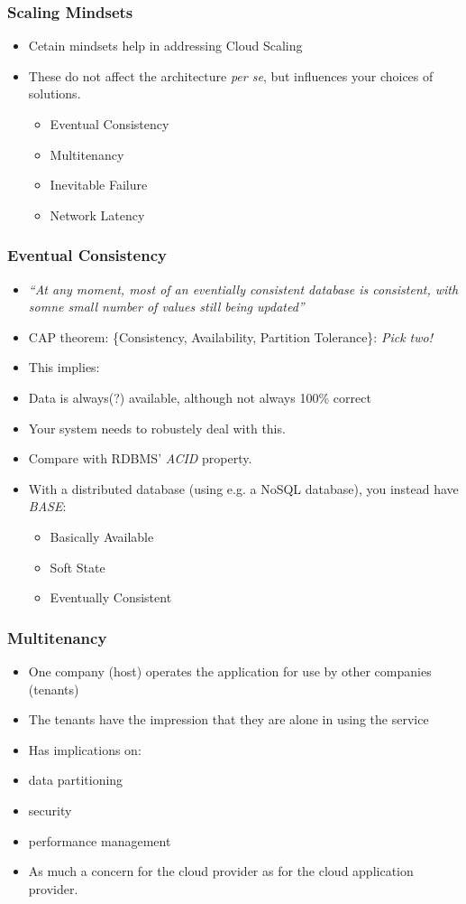\documentclass[10pt]{beamer}
\def\subitem{\item[\hspace{1.5cm} -]}
\begin{document}
\begin{frame}[t]
\frametitle{Scaling Mindsets}
\begin{itemize}
\item Cetain mindsets help in addressing Cloud Scaling 
\item These do not affect the architecture \emph{per se}, but influences your choices of solutions.
\begin{itemize}
\item Eventual Consistency
\item Multitenancy
\item Inevitable Failure
\item Network Latency
\end{itemize}
\end{itemize}
\end{frame}

\begin{frame}[t]
\frametitle{Eventual Consistency}
\begin{itemize}[<+->]
\item \emph{``At any moment, most of an eventially consistent database is consistent, with somne small number of values still being updated''}
\item CAP theorem: \{Consistency, Availability, Partition Tolerance\}: \emph{Pick two!}
\item This implies:
\subitem Data is always(?) available, although not always 100\% correct
\subitem Your system needs to robustely deal with this.
\item Compare with RDBMS' \emph{ACID} property.
\item With a distributed database (using e.g. a NoSQL database), you instead have \emph{BASE}:
\begin{itemize}
\item Basically Available
\item Soft State
\item Eventually Consistent
\end{itemize}
\end{itemize}
\end{frame}

\begin{frame}[t]
\frametitle{Multitenancy}
\begin{itemize}
\item One company (host) operates the application for use by other companies (tenants)
\item The tenants have the impression that they are alone in using the service
\item Has implications on:
\subitem data partitioning
\subitem security
\subitem performance management
\item As much a concern for the cloud provider as for the cloud application provider.
\end{itemize}
\end{frame}
\end{document}

